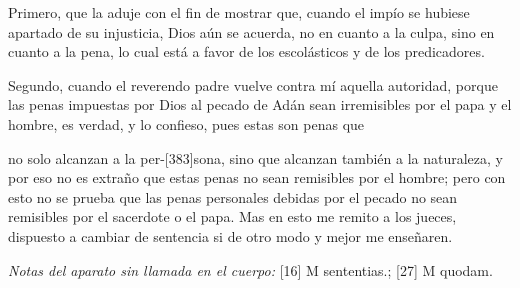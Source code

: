Primero, que la aduje con el fin de mostrar que, cuando el impío se hubiese apartado de su injusticia, Dios aún se acuerda, no en cuanto a la culpa, sino en cuanto a la pena, lo cual está a favor de los escolásticos y de los predicadores.

Segundo, cuando el reverendo padre vuelve contra mí aquella autoridad, porque las penas impuestas por Dios al pecado de Adán sean irremisibles por el papa y el hombre, es verdad, y lo confieso, pues estas son penas que

no solo alcanzan a la per-[383]sona, sino que alcanzan también a la naturaleza, y por eso no es extraño que estas penas no sean remisibles por el hombre; pero con esto no se prueba que las penas personales debidas por el pecado no sean remisibles por el sacerdote o el papa. Mas en esto me remito a los jueces, dispuesto a cambiar de sentencia si de otro modo y mejor me enseñaren.

\noindent\textit{Notas del aparato sin llamada en el cuerpo:} [16] M sententias.; [27] M quodam.
